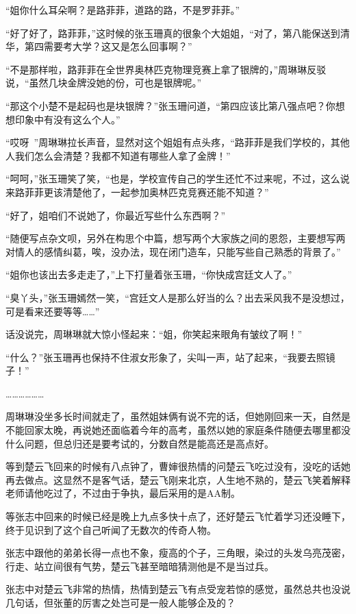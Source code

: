 “姐你什么耳朵啊？是路菲菲，道路的路，不是罗菲菲。”

“好了好了，路菲菲，”这时候的张玉珊真的很象个大姐姐，“对了，第八能保送到清华，第四需要考大学？这又是怎么回事啊？”

“不是那样啦，路菲菲在全世界奥林匹克物理竞赛上拿了银牌的，”周琳琳反驳说，“虽然几块金牌没她的份，可也是银牌呢。”

“那这个小楚不是起码也是块银牌？”张玉珊问道，“第四应该比第八强点吧？你想想印象中有没有这么个人。”

“哎呀~”周琳琳拉长声音，显然对这个姐姐有点头疼，“路菲菲是我们学校的，其他人我们怎么会清楚？我都不知道有哪些人拿了金牌！”

“呵呵，”张玉珊笑了笑，“也是，学校宣传自己的学生还忙不过来呢，不过，这么说来路菲菲更该清楚他了，一起参加奥林匹克竞赛还能不知道？”

“好了，姐咱们不说她了，你最近写些什么东西啊？”

“随便写点杂文呗，另外在构思个中篇，想写两个大家族之间的恩怨，主要想写两对情人的感情纠葛，唉，没办法，现在闭门造车，只能写些自己熟悉的背景了。”

“姐你也该出去多走走了，”上下打量着张玉珊，“你快成宫廷文人了。”

“臭丫头，”张玉珊嫣然一笑，“宫廷文人是那么好当的么？出去采风我不是没想过，可是看来还要等等……”

话没说完，周琳琳就大惊小怪起来：“姐，你笑起来眼角有皱纹了啊！”

“什么？”张玉珊再也保持不住淑女形象了，尖叫一声，站了起来，“我要去照镜子！”

………………

周琳琳没坐多长时间就走了，虽然姐妹俩有说不完的话，但她刚回来一天，自然是不能回家太晚，再说她还面临着今年的高考，虽然以她的家庭条件随便去哪里都没什么问题，但总归还是要考试的，分数自然是能高还是高点好。

等到楚云飞回来的时候有八点钟了，曹婶很热情的问楚云飞吃过没有，没吃的话她再去做点。这显然不是客气话，楚云飞刚来北京，人生地不熟的，楚云飞笑着解释老师请他吃过了，不过由于争执，最后采用的是AA制。

等张志中回来的时候已经是晚上九点多快十点了，还好楚云飞忙着学习还没睡下，终于见识到了这个自己听闻了无数次的传奇人物。

张志中跟他的弟弟长得一点也不象，瘦高的个子，三角眼，染过的头发乌亮茂密，行走、站立间很有气势，楚云飞甚至暗暗猜测他是不是当过兵。

张志中对楚云飞非常的热情，热情到楚云飞有点受宠若惊的感觉，虽然总共也没说几句话，但张董的厉害之处岂可是一般人能够企及的？

